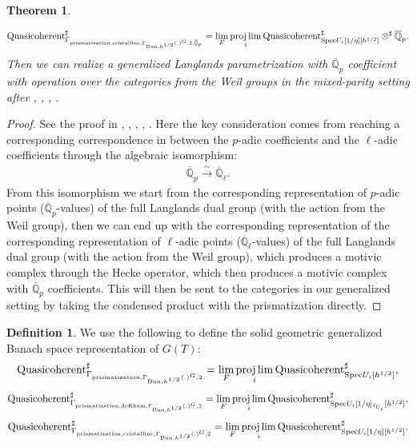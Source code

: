 \documentclass[12pt]{article}
\newtheorem{theorem}{Theorem}
\theoremstyle{definition}
\newtheorem{definition}{Definition}
\begin{document}
\begin{theorem}
\begin{align}
\end{align}
\begin{align}
\mathrm{Quasicoherent}^\sharp_{\mathrm{\Gamma}_{\mathrm{prismatization},\mathrm{cristalline},\mathrm{\Gamma}_{\mathrm{Bun},h^{1/2}}(.)^G,2,\overline{\mathbb{Q}}_p}}=\lim_{F}\projlim_i \mathrm{Quasicoherent}^\sharp_{\mathrm{Spec}U_i[1/\eta][h^{1/2}]}\otimes^\sharp \overline{\mathbb{Q}}_p.
\end{align}
Then we can realize a generalized Langlands parametrization with $\overline{\mathbb{Q}}_p$ coefficient with operation over the categories from the Weil groups in the mixed-parity setting after \cite{FS}, \cite{TIV}, \cite{TV}, \cite{TVI}.
\end{theorem}

\begin{proof}
See the proof in \cite[Chapter VIII, IX]{FS}, \cite{VL}, \cite{TIV}, \cite{TV}, \cite{TVI}. Here the key consideration comes from reaching a corresponding correspondence in between the $p$-adic coefficients and the $\ell$-adic coefficients through the algebraic isomorphism:
\begin{align}
\overline{\mathbb{Q}}_p \overset{\sim}{\longrightarrow} \overline{\mathbb{Q}}_\ell.
\end{align}
From this isomorphism we start from the corresponding representation of $p$-adic points ($\overline{\mathbb{Q}}_p$-values) of the full Langlands dual group (with the action from the Weil group), then we can end up with the corresponding representation of the corresponding representation of $\ell$-adic points ($\overline{\mathbb{Q}}_\ell$-values) of the full Langlands dual group (with the action from the Weil group), which produces a motivic complex through the Hecke operator, which then produces a motivic complex with $\overline{\mathbb{Q}}_p$ coefficients. This will then be sent to the categories in our generalized setting by taking the condensed product with the prismatization directly.
\end{proof}

\begin{definition}
We use the following to define the solid geometric generalized Banach space representation of $G(T)$:
\begin{align}
\mathrm{Quasicoherent}^\sharp_{\mathrm{\Gamma}_{\mathrm{prismatization},\mathrm{\Gamma}_{\mathrm{Bun},h^{1/2}}(.)^G,2}}=\lim_{F}\projlim_i \mathrm{Quasicoherent}^\sharp_{\mathrm{Spec}U_i[h^{1/2}]},
\end{align}
\begin{align}
\mathrm{Quasicoherent}^\sharp_{\mathrm{\Gamma}_{\mathrm{prismatization},\mathrm{deRham},\mathrm{\Gamma}_{\mathrm{Bun},h^{1/2}}(.)^G,2}}=\lim_{F}\projlim_i \mathrm{Quasicoherent}^\sharp_{\mathrm{Spec}U_i[1/\eta]_{I_{U_i}}[h^{1/2}]},
\end{align}
\begin{align}
\mathrm{Quasicoherent}^\sharp_{\mathrm{\Gamma}_{\mathrm{prismatization},\mathrm{cristalline},\mathrm{\Gamma}_{\mathrm{Bun},h^{1/2}}(.)^G,2}}=\lim_{F}\projlim_i \mathrm{Quasicoherent}^\sharp_{\mathrm{Spec}U_i[1/\eta][h^{1/2}]}.
\end{align}
\end{definition}
\end{document}
